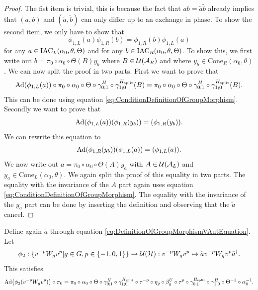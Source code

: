 \documentclass[12pt,a4paper,twoside]{article}
\numberwithin{equation}{section}
\begin{document}
\begin{proof}
	The fist item is trivial, this is because the fact that $ab=\tilde{a}\tilde{b}$ already implies that $(a,b)$ and $(\tilde{a},\tilde{b})$ can only differ up to an exchange in phase. To show the second item, we only have to show that
	\begin{equation}
		\phi_{1,L}(a)\phi_{1,R}(b)=\phi_{1,R}(b)\phi_{1,L}(a)
	\end{equation}
	for any $a\in \textrm{IAC}_{L}(\alpha_0,\theta,\Theta)$ and for any $b\in \textrm{IAC}_{R}(\alpha_0,\theta,\Theta)$. To show this, we first write out $b=\pi_0\circ\alpha_0\circ\Theta(B)y_b$ where $B\in\mathcal U(\mathcal A_R)$ and where $y_b\in\textrm{Cone}_R(\alpha_0,\theta)$. We can now split the proof in two parts. First we want to prove that
	\begin{equation}
		\Ad{\phi_{1,L}(a)}\circ\pi_0\circ\alpha_0\circ\Theta\circ\gamma_{0;1}^H\circ\gamma^\Hsplit_{1;0}(B)=\pi_0\circ\alpha_0\circ\Theta\circ\gamma_{0;1}^H\circ\gamma^\Hsplit_{1;0}(B).
	\end{equation}
	This can be done using equation \eqref{eq:ConditionDefinitionOfGroupMorphism}. Secondly we want to prove that
	\begin{equation}
		\Ad{\phi_{1,L}(a)}(\phi_{1,R}(y_b))=(\phi_{1,R}(y_b)).
	\end{equation}
	We can rewrite this equation to
	\begin{equation}
		\Ad{\phi_{1,R}(y_b)}(\phi_{1,L}(a))=(\phi_{1,L}(a)).
	\end{equation}
	We now write out $a=\pi_0\circ\alpha_0\circ\Theta(A)y_a$ with $A\in\mathcal U(\mathcal A_L)$ and $y_a\in\textrm{Cone}_L(\alpha_0,\theta)$. We again split the proof of this equality in two parts. The equality with the invariance of the $A$ part again uses equation \eqref{eq:ConditionDefinitionOfGroupMorphism}. The equality with the invariance of the $y_a$ part can be done by inserting the definition and observing that the $\tilde{a}$ cancel.
\end{proof}
\begin{lemma}\label{lem:DefinitionOfWgMap}
	Define again $\tilde{a}$ through equation \eqref{eq:DefinitionOfGroupMorphismVAutEquation}. Let
	\begin{equation}
		\phi_2:\{v^{-p} W_g v^{p}|g\in G,p\in\{-1,0,1\}\}\rightarrow \mathcal U(\mathcal H):v^{-p} W_g v^{p}\mapsto \tilde{a}v^{-p} W_g v^{p}\tilde{a}^\dagger.
	\end{equation}
	This satisfies
	\begin{equation}\label{eq:lemDefinitionOfWgMapCondition}
		\Ad{\phi_2(v^{-p}W_g v^{p})}\circ\pi_0=\pi_0\circ \alpha_0\circ\Theta\circ\gamma^{H}_{0;1}\circ\gamma^{H_\text{split}}_{1;0}\circ\tau^{-p}\circ\eta_g\circ\beta_g^U\circ\tau^p\circ\gamma^{H_\text{split}}_{0;1}\circ\gamma^{H}_{1;0}\circ\Theta^{-1}\circ\alpha_0^{-1}.
	\end{equation}
\end{lemma}
\end{document}

